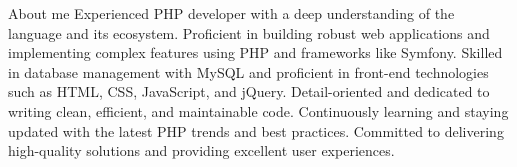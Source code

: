 \documentclass[]{kyvernitis-resume}
\begin{document}
\resumeheader
{}
{}
{}
{}
{\address{Karaj, Alborz Province, Iran}}
{}

\begin{section}{About me}
Experienced PHP developer with a deep understanding of the language and its ecosystem. Proficient in building robust web applications and implementing complex features using PHP and frameworks like Symfony. Skilled in database management with MySQL and proficient in front-end technologies such as HTML, CSS, JavaScript, and jQuery. Detail-oriented and dedicated to writing clean, efficient, and maintainable code. Continuously learning and staying updated with the latest PHP trends and best practices. Committed to delivering high-quality solutions and providing excellent user experiences.
\end{section}
\end{document}
